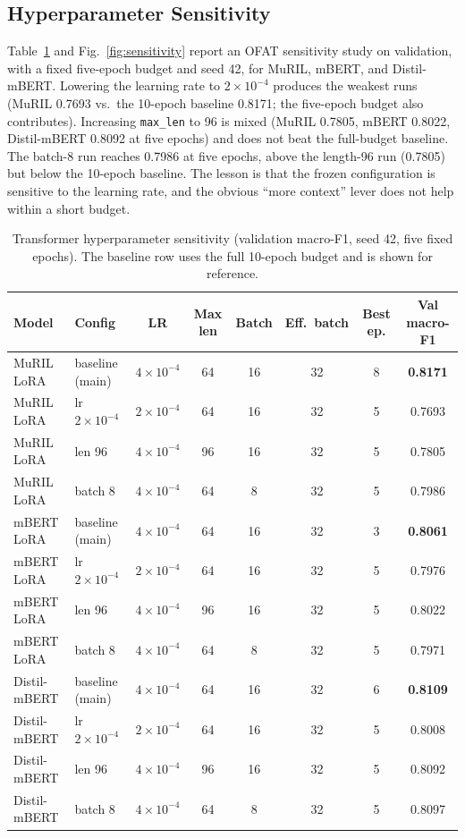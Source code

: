 \documentclass[10pt,journal]{IEEEtran}
\begin{document}
\subsection{Hyperparameter Sensitivity}
Table~\ref{tab:sensitivity} and Fig.~\ref{fig:sensitivity} report an OFAT sensitivity study on validation, with a fixed five-epoch budget and seed 42, for MuRIL, mBERT, and Distil-mBERT. Lowering the learning rate to $2\times10^{-4}$ produces the weakest runs (MuRIL 0.7693 vs.\ the 10-epoch baseline 0.8171; the five-epoch budget also contributes). Increasing \texttt{max\_len} to 96 is mixed (MuRIL 0.7805, mBERT 0.8022, Distil-mBERT 0.8092 at five epochs) and does not beat the full-budget baseline. The batch-8 run reaches 0.7986 at five epochs, above the length-96 run (0.7805) but below the 10-epoch baseline. The lesson is that the frozen configuration is sensitive to the learning rate, and the obvious ``more context'' lever does not help within a short budget.

\begin{table}[t]
\caption{Transformer hyperparameter sensitivity (validation macro-F1, seed 42, five fixed epochs). The baseline row uses the full 10-epoch budget and is shown for reference.}
\label{tab:sensitivity}
\centering
\footnotesize
\setlength{\tabcolsep}{6pt}
\begin{tabular}{llcccccc}
\toprule
Model & Config & LR & Max len & Batch & Eff.\ batch & Best ep. & Val macro-F1 \\
\midrule
MuRIL LoRA      & baseline (main)      & $4\times10^{-4}$ & 64 & 16 & 32 & 8 & \textbf{0.8171} \\
MuRIL LoRA      & lr$2\times10^{-4}$   & $2\times10^{-4}$ & 64 & 16 & 32 & 5 & 0.7693 \\
MuRIL LoRA      & len 96               & $4\times10^{-4}$ & 96 & 16 & 32 & 5 & 0.7805 \\
MuRIL LoRA      & batch 8              & $4\times10^{-4}$ & 64 & 8  & 32 & 5 & 0.7986 \\
mBERT LoRA      & baseline (main)      & $4\times10^{-4}$ & 64 & 16 & 32 & 3 & \textbf{0.8061} \\
mBERT LoRA      & lr$2\times10^{-4}$   & $2\times10^{-4}$ & 64 & 16 & 32 & 5 & 0.7976 \\
mBERT LoRA      & len 96               & $4\times10^{-4}$ & 96 & 16 & 32 & 5 & 0.8022 \\
mBERT LoRA      & batch 8              & $4\times10^{-4}$ & 64 & 8  & 32 & 5 & 0.7971 \\
Distil-mBERT    & baseline (main)      & $4\times10^{-4}$ & 64 & 16 & 32 & 6 & \textbf{0.8109} \\
Distil-mBERT    & lr$2\times10^{-4}$   & $2\times10^{-4}$ & 64 & 16 & 32 & 5 & 0.8008 \\
Distil-mBERT    & len 96               & $4\times10^{-4}$ & 96 & 16 & 32 & 5 & 0.8092 \\
Distil-mBERT    & batch 8              & $4\times10^{-4}$ & 64 & 8  & 32 & 5 & 0.8097 \\
\bottomrule
\end{tabular}
\end{table}
\end{document}
